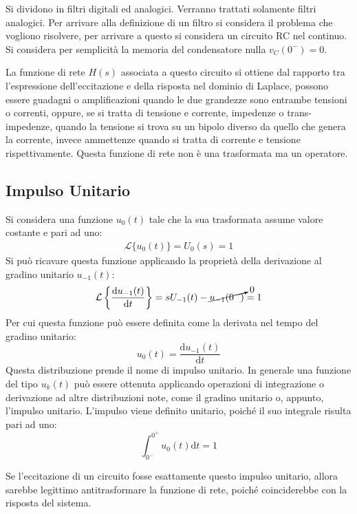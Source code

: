 \documentclass{article}
\newcommand{\df}{\mathrm{d}}
\numberwithin{equation}{subsection}
\begin{document}
Si dividono in filtri digitali ed analogici. Verranno trattati solamente filtri analogici.  
Per arrivare alla definizione di un filtro si considera il problema che vogliono risolvere, per arrivare a questo si considera un circuito RC nel continuo. 
Si considera per semplicità la memoria del condensatore nulla $v_C(0^-)=0$. 

La funzione di rete $H(s)$ associata a questo circuito si ottiene dal rapporto tra l'espressione dell'eccitazione e della risposta nel dominio di Laplace, possono essere 
guadagni o amplificazioni quando le due grandezze sono entrambe tensioni o correnti, oppure, se si tratta di tensione e corrente, impedenze o trans-impedenze, quando la tensione si trova su un bipolo diverso 
da quello che genera la corrente, invece ammettenze quando si tratta di corrente e tensione rispettivamente. 
Questa funzione di rete non è una trasformata ma un operatore. 

\subsection{Impulso Unitario}

Si considera una funzione $u_0(t)$ tale che la sua trasformata assume valore costante e pari ad uno:
\begin{gather}
    \mathcal{L}\{u_0(t)\}=U_0(s)=1
\end{gather}
Si può ricavare questa funzione applicando la proprietà della derivazione al gradino unitario $u_{-1}(t)$:
\begin{gather*}
    \mathcal{L}\left\{\displaystyle\frac{\df u_{-1}(t)}{\df t}\right\}=sU_{-1}(t)-\cancelto{0}{u_{-1}(0^-)}=1
\end{gather*}
Per cui questa funzione può essere definita come la derivata nel tempo del gradino unitario:
\begin{equation}
    u_0(t)=\displaystyle\frac{\df u_{-1}(t)}{\df t}
\end{equation}
Questa distribuzione prende il nome di impulso unitario. In generale una funzione del tipo $u_{k}(t)$ può essere ottenuta applicando operazioni di integrazione o derivazione 
ad altre distribuzioni note, come il gradino unitario o, appunto, l'impulso unitario. 
L'impulso viene definito unitario, poiché il suo integrale risulta pari ad uno:
\begin{equation}
    \displaystyle\int_{0^-}^{0^+}u_{0}(t)\df t=1
\end{equation}

Se l'eccitazione di un circuito fosse esattamente questo impulso unitario, allora sarebbe legittimo antitrasformare la funzione di rete, poiché coinciderebbe con la risposta 
del sistema. 
\end{document}
